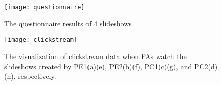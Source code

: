 %  
%

\begin{figure}
 \centering %
 \texttt{[image: questionnaire]}
 \caption{The questionnaire results of 4 slideshows
 }
 \label{fig:questionnaire}
\end{figure}

\begin{figure}
 \centering %
 \texttt{[image: clickstream]}
 \caption{The visualization of clickstream data when PAs watch the slideshows created by PE1(a)(e), PE2(b)(f), PC1(c)(g), and PC2(d)(h), respectively. 
 }
 \label{fig:clickstream}
\end{figure}

